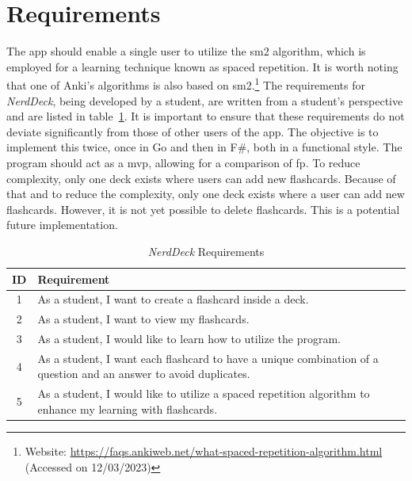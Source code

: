     \section{Requirements}\label{sec:requirements}
    The \ac{app} should enable a single user to utilize the \ac{sm2} algorithm, which is employed for a learning technique known as spaced repetition.\cite{Sm2} It is worth noting that one of Anki's algorithms is also based on \ac{sm2}.\footnote{Website: \url{https://faqs.ankiweb.net/what-spaced-repetition-algorithm.html} (Accessed on 12/03/2023)} The requirements for \textit{NerdDeck}, being developed by a student, are written from a student's perspective and are listed in table\ \ref{tab:requirements}. It is important to ensure that these requirements do not deviate significantly from those of other users of the \ac{app}. The objective is to implement this twice, once  in Go and then in F\#, both in a functional style. The program should act as a \ac{mvp}, allowing for a comparison of \ac{fp}. To reduce complexity, only one deck exists where users can add new flashcards. Because of that and to reduce the complexity, only one deck exists where a user can add new flashcards. However, it is not yet possible to delete flashcards. This is a potential future implementation.

    \begin{table}[ht]
        \centering
        \begin{tabular}{|c|p{4in}|}
            \hline
            \textbf{ID} & \textbf{Requirement} \\
            \hline
            1 & As a student, I want to create a flashcard inside a deck. \\
            \hline
            2 & As a student, I want to view my flashcards. \\
            \hline
            3 & As a student, I would like to learn how to utilize the program. \\
            \hline
            4 & As a student, I want each flashcard to have a unique combination of a question and an answer to avoid duplicates.  \\
            \hline
            5 & As a student, I would like to utilize a spaced repetition algorithm to enhance my learning with flashcards. \\
            \hline
        \end{tabular}
        \caption{\textit{NerdDeck} Requirements}\label{tab:requirements}
    \end{table}

